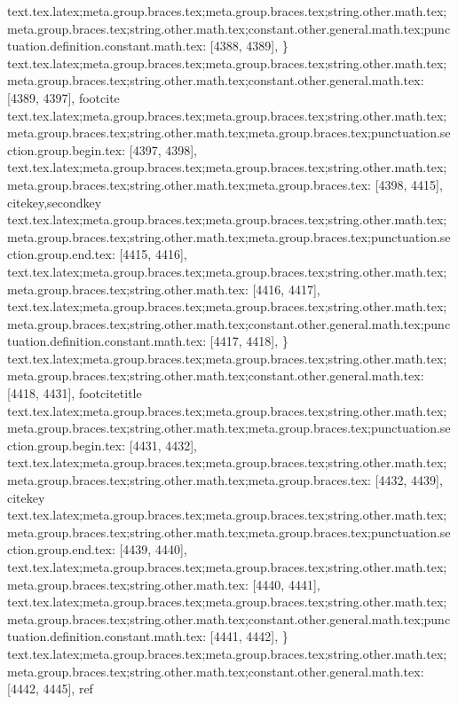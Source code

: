 {{{{{{{{{{{{{{{{{{{{{{{{{{{{{{{{{{{{{{{{{{{{{{{{{{{{{{{{{{{{{{{{{{{{{{{{{{{{{{{{{{{{{{{{{{{{{{{{{{{{{{{{{{{{{{{{{{{{{{{{{{{{{{{{{{{{{{{{{{{}
text.tex.latex;meta.group.braces.tex;meta.group.braces.tex;string.other.math.tex;meta.group.braces.tex;string.other.math.tex;constant.other.general.math.tex;punctuation.definition.constant.math.tex: [4388, 4389], {\}
text.tex.latex;meta.group.braces.tex;meta.group.braces.tex;string.other.math.tex;meta.group.braces.tex;string.other.math.tex;constant.other.general.math.tex: [4389, 4397], {footcite}
text.tex.latex;meta.group.braces.tex;meta.group.braces.tex;string.other.math.tex;meta.group.braces.tex;string.other.math.tex;meta.group.braces.tex;punctuation.section.group.begin.tex: [4397, 4398], {{}
text.tex.latex;meta.group.braces.tex;meta.group.braces.tex;string.other.math.tex;meta.group.braces.tex;string.other.math.tex;meta.group.braces.tex: [4398, 4415], {citekey,secondkey}
text.tex.latex;meta.group.braces.tex;meta.group.braces.tex;string.other.math.tex;meta.group.braces.tex;string.other.math.tex;meta.group.braces.tex;punctuation.section.group.end.tex: [4415, 4416], {}}
text.tex.latex;meta.group.braces.tex;meta.group.braces.tex;string.other.math.tex;meta.group.braces.tex;string.other.math.tex: [4416, 4417], {
}
text.tex.latex;meta.group.braces.tex;meta.group.braces.tex;string.other.math.tex;meta.group.braces.tex;string.other.math.tex;constant.other.general.math.tex;punctuation.definition.constant.math.tex: [4417, 4418], {\}
text.tex.latex;meta.group.braces.tex;meta.group.braces.tex;string.other.math.tex;meta.group.braces.tex;string.other.math.tex;constant.other.general.math.tex: [4418, 4431], {footcitetitle}
text.tex.latex;meta.group.braces.tex;meta.group.braces.tex;string.other.math.tex;meta.group.braces.tex;string.other.math.tex;meta.group.braces.tex;punctuation.section.group.begin.tex: [4431, 4432], {{}
text.tex.latex;meta.group.braces.tex;meta.group.braces.tex;string.other.math.tex;meta.group.braces.tex;string.other.math.tex;meta.group.braces.tex: [4432, 4439], {citekey}
text.tex.latex;meta.group.braces.tex;meta.group.braces.tex;string.other.math.tex;meta.group.braces.tex;string.other.math.tex;meta.group.braces.tex;punctuation.section.group.end.tex: [4439, 4440], {}}
text.tex.latex;meta.group.braces.tex;meta.group.braces.tex;string.other.math.tex;meta.group.braces.tex;string.other.math.tex: [4440, 4441], {
}
text.tex.latex;meta.group.braces.tex;meta.group.braces.tex;string.other.math.tex;meta.group.braces.tex;string.other.math.tex;constant.other.general.math.tex;punctuation.definition.constant.math.tex: [4441, 4442], {\}
text.tex.latex;meta.group.braces.tex;meta.group.braces.tex;string.other.math.tex;meta.group.braces.tex;string.other.math.tex;constant.other.general.math.tex: [4442, 4445], {ref}
}}}}}}}}}}}}}}}}}}}}}}}}}}}}}}}}}}}}}}}}}}}}}}}}}}}}}}}}}}}}}}}}}}}}}}}}}}}}}}}}}}}}}}}}}}}}}}}}}}}}}}}}}}}}}}}}}}}}}}}}}}}}}}}}}}}}}}}}}}}}}
